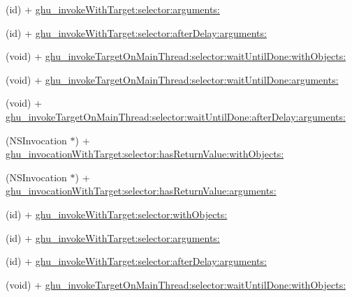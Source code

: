 \begin{DoxyCompactItemize}
\item 
(id) + \hyperlink{interface_n_s_invocation_07_g_h_utils___g_h_u_n_i_t_08_a0aa9a0433b00c60a8174c7bed363821f}{ghu\-\_\-invoke\-With\-Target\-:selector\-:arguments\-:}
\item 
(id) + \hyperlink{interface_n_s_invocation_07_g_h_utils___g_h_u_n_i_t_08_a7f856b1af207762c610e597941411091}{ghu\-\_\-invoke\-With\-Target\-:selector\-:after\-Delay\-:arguments\-:}
\item 
(void) + \hyperlink{interface_n_s_invocation_07_g_h_utils___g_h_u_n_i_t_08_a6933a1f0fd7d0d4b8f133baf53f30a31}{ghu\-\_\-invoke\-Target\-On\-Main\-Thread\-:selector\-:wait\-Until\-Done\-:with\-Objects\-:}
\item 
(void) + \hyperlink{interface_n_s_invocation_07_g_h_utils___g_h_u_n_i_t_08_a261cd5aa6061478716fba4f79cb4f69b}{ghu\-\_\-invoke\-Target\-On\-Main\-Thread\-:selector\-:wait\-Until\-Done\-:arguments\-:}
\item 
(void) + \hyperlink{interface_n_s_invocation_07_g_h_utils___g_h_u_n_i_t_08_a0b891f27c084f6677907e0f907caf5f9}{ghu\-\_\-invoke\-Target\-On\-Main\-Thread\-:selector\-:wait\-Until\-Done\-:after\-Delay\-:arguments\-:}
\item 
(\-N\-S\-Invocation $\ast$) + \hyperlink{interface_n_s_invocation_07_g_h_utils___g_h_u_n_i_t_08_a31d3598ec7e21face3cb783c2c60b42c}{ghu\-\_\-invocation\-With\-Target\-:selector\-:has\-Return\-Value\-:with\-Objects\-:}
\item 
(\-N\-S\-Invocation $\ast$) + \hyperlink{interface_n_s_invocation_07_g_h_utils___g_h_u_n_i_t_08_a64dcd5d1f117118b02213db0846092d9}{ghu\-\_\-invocation\-With\-Target\-:selector\-:has\-Return\-Value\-:arguments\-:}
\item 
(id) + \hyperlink{interface_n_s_invocation_07_g_h_utils___g_h_u_n_i_t_08_af60de644c62297e237a21adf2ea75e80}{ghu\-\_\-invoke\-With\-Target\-:selector\-:with\-Objects\-:}
\item 
(id) + \hyperlink{interface_n_s_invocation_07_g_h_utils___g_h_u_n_i_t_08_a0aa9a0433b00c60a8174c7bed363821f}{ghu\-\_\-invoke\-With\-Target\-:selector\-:arguments\-:}
\item 
(id) + \hyperlink{interface_n_s_invocation_07_g_h_utils___g_h_u_n_i_t_08_a7f856b1af207762c610e597941411091}{ghu\-\_\-invoke\-With\-Target\-:selector\-:after\-Delay\-:arguments\-:}
\item 
(void) + \hyperlink{interface_n_s_invocation_07_g_h_utils___g_h_u_n_i_t_08_a6933a1f0fd7d0d4b8f133baf53f30a31}{ghu\-\_\-invoke\-Target\-On\-Main\-Thread\-:selector\-:wait\-Until\-Done\-:with\-Objects\-:}

\end{DoxyCompactItemize}
